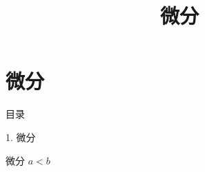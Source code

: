 \documentclass[aspectratio=169,10pt,fontset=fandol]{ctexbeamer}
\title{微分}
\begin{document}
\section{微分}
\begin{frame}[t,fragile]{目录}
\normalsize
{\color{blue}\normalsize 1. 微分\par}\vspace{0.22em}
\end{frame}
\begin{frame}[t,fragile]{微分}
\normalsize
{\normalsize
{\fontsize{4}{5}\selectfont $a<b$}
}
\end{frame}
\end{document}
